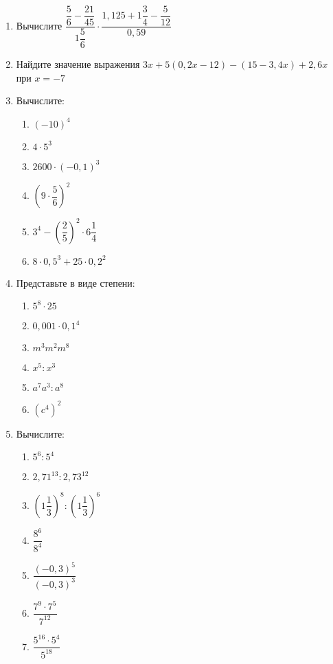 \documentclass[12pt, a4paper]{article}
\begin{document}
		

\begin{enumerate}
	\item Вычислите
	$\dfrac{\dfrac{5}{6}-\dfrac{21}{45}}{1\dfrac{5}{6}}\cdot\dfrac{1,125+1\dfrac{3}{4}-\dfrac{5}{12}}{0,59}$
	\item Найдите значение выражения $3x+5(0,2x-12)-(15-3,4x)+2,6x$ при $x=-7$
	\item Вычислите:
	\begin{multicols}{2}
		\begin{enumerate}[label=\asbuk*)]
			\item $(-10)^4$
			\item $4\cdot5^3$
			\item $2600\cdot(-0,1)^3$
			\item $\left(9\cdot\dfrac{5}{6}\right)^2$
			\item $3^4-\left( \dfrac{2}{5}\right)^2\cdot6\dfrac{1}{4}$
			\item $8\cdot0,5^3+25\cdot0,2^2$
		\end{enumerate}
	\end{multicols}
	\item Представьте в виде степени:
	\begin{multicols}{2}
		\begin{enumerate}[label=\asbuk*)]
			\item $5^8\cdot25$
			\item $0,001\cdot0,1^4$
			\item $m^3m^2m^8$
			\item $x^5:x^3$
			\item $a^7a^3:a^8$
			\item $(c^4)^2$
		\end{enumerate}
	\end{multicols}
	\item Вычислите:
	\begin{multicols}{2}
		\begin{enumerate}[label=\asbuk*)]
			\item $5^6:5^4$
			\item $2,71^{13}:2,73^{12}$
			\item $\left(1\dfrac{1}{3}\right)^8 : \left(1\dfrac{1}{3}\right)^6  $
			\item $\dfrac{8^6}{8^4}$
			\item $\dfrac{(-0,3)^5}{(-0,3)^3}$
			\item $\dfrac{7^9\cdot7^5}{7^12}$
			\item $\dfrac{5^{16}\cdot5^4}{5^{18}}$

\end{enumerate}
\end{multicols}
\end{enumerate}
\end{document}
